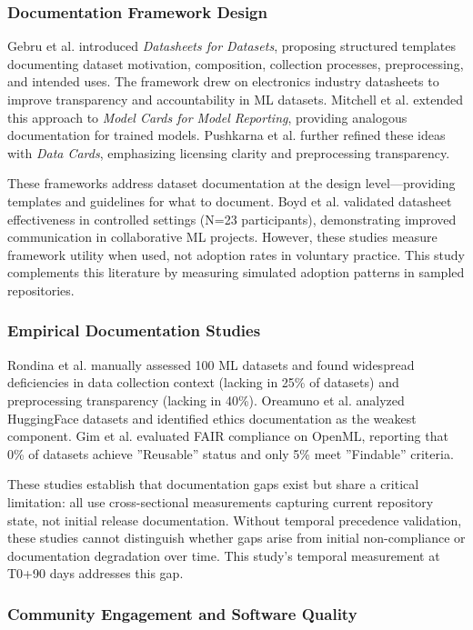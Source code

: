 
\subsubsection{Documentation Framework Design}

Gebru et al. introduced \textit{Datasheets for Datasets}, proposing structured templates documenting dataset motivation, composition, collection processes, preprocessing, and intended uses. The framework drew on electronics industry datasheets to improve transparency and accountability in ML datasets. Mitchell et al. extended this approach to \textit{Model Cards for Model Reporting}, providing analogous documentation for trained models. Pushkarna et al. further refined these ideas with \textit{Data Cards}, emphasizing licensing clarity and preprocessing transparency.

These frameworks address dataset documentation at the design level---providing templates and guidelines for what to document. Boyd et al. validated datasheet effectiveness in controlled settings (N=23 participants), demonstrating improved communication in collaborative ML projects. However, these studies measure framework utility when used, not adoption rates in voluntary practice. This study complements this literature by measuring simulated adoption patterns in sampled repositories.

\subsubsection{Empirical Documentation Studies}

Rondina et al. manually assessed 100 ML datasets and found widespread deficiencies in data collection context (lacking in 25\% of datasets) and preprocessing transparency (lacking in 40\%). Oreamuno et al. analyzed HuggingFace datasets and identified ethics documentation as the weakest component. Gim et al. evaluated FAIR compliance on OpenML, reporting that 0\% of datasets achieve ''Reusable'' status and only 5\% meet ''Findable'' criteria.

These studies establish that documentation gaps exist but share a critical limitation: all use cross-sectional measurements capturing current repository state, not initial release documentation. Without temporal precedence validation, these studies cannot distinguish whether gaps arise from initial non-compliance or documentation degradation over time. This study's temporal measurement at T0+90 days addresses this gap.

\subsubsection{Community Engagement and Software Quality}

